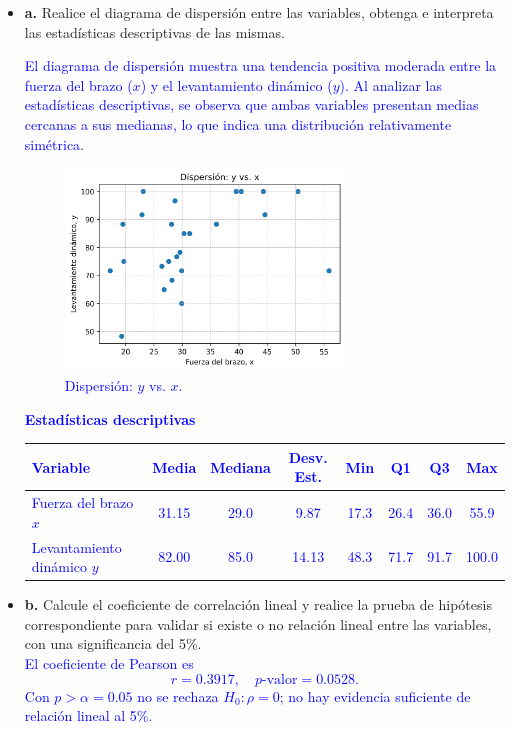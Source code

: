 \documentclass[10pt]{article}
\begin{document}
	\begin{itemize}
		\item \textbf{a.} Realice el diagrama de dispersión entre las variables, obtenga e interpreta las estadísticas descriptivas de las mismas.\\
		\textcolor{blue}{El diagrama de dispersión muestra una tendencia positiva moderada entre la fuerza del brazo ($x$) y el levantamiento dinámico ($y$). Al analizar las estadísticas descriptivas, se observa que ambas variables presentan medias cercanas a sus medianas, lo que indica una distribución relativamente simétrica.\\
		\begin{figure}[H]
			\centering
			\includegraphics[width=0.7\textwidth]{../plots/python/ejercicio1/scatter_plot.png}
			\caption{Dispersión: $y$ vs. $x$.}
			\label{fig:scatter}
		\end{figure}
			\noindent\textbf{Estadísticas descriptivas}
			\begin{center}
				\begin{tabular}{lccccccc}
					\hline
					Variable & Media & Mediana & Desv. Est. & Min & Q1 & Q3 & Max \\
					\hline
					Fuerza del brazo $x$ & 31.15 & 29.0 & 9.87 & 17.3 & 26.4 & 36.0 & 55.9 \\
					Levantamiento dinámico $y$ & 82.00 & 85.0 & 14.13 & 48.3 & 71.7 & 91.7 & 100.0 \\
					\hline
				\end{tabular}
			\end{center}
		}

		\item \textbf{b.} Calcule el coeficiente de correlación lineal y realice la prueba de hipótesis correspondiente para validar si existe o no relación lineal entre las variables, con una significancia del 5\%.\\
		\textcolor{blue}{
			El coeficiente de Pearson es
			\[
				r=0.3917, \quad p\text{-valor}=0.0528.
			\]
			Con $p>\alpha=0.05$ no se rechaza $H_0: \rho=0$; no hay evidencia suficiente de relación lineal al 5\%.
		}
		


\end{itemize}
\end{document}
